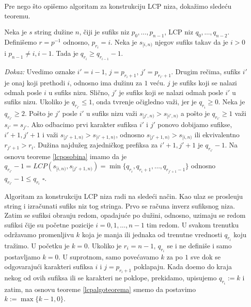 Pre nego \v sto opi\v semo algoritam za konstrukciju LCP niza, doka\v zimo slede\' cu teoremu.

\begin{thm}
\label{lcpalgoteorema}
Neka je $s$ string du\v zine $n$, \v ciji je sufiks niz $p_0, \ldots, p_{n-1}$, LCP niz $q_0, \ldots, q_{n-2}$. Defini\v semo $r = p^{-1}$ odnosno, $p_{r_i} = i$. Neka je $s_{[i, n)}$ njegov sufiks takav da je $i>0$ i $p_{n-1} \not = i, i-1$. Tada je $q_{r_i} \geq q_{r_{i-1}} - 1$.
\end{thm}

\textit{Dokaz:} Uvedimo oznake $i' = i-1$, $j = p_{r_i + 1}$, $j' = p_{r_{i'} + 1}$. Drugim re\v cima, sufiks $i'$ je onaj koji prethodi $i$, odnosno ima du\v zinu za $1$ ve\' cu. $j$ je sufiks koji se nalazi odmah posle $i$ u sufiks nizu. Sli\v cno, $j'$ je sufiks koji se nalazi odmah posle $i'$ u sufiks nizu.  Ukoliko je $q_{r_{i'}} \leq 1$, onda tvr\dj enje o\v cigledno va\v zi, jer je $q_{r_i} \geq 0$. Neka je $q_{r_{i'}} \geq 2$. Po\v sto je $j'$ posle $i'$ u sufiks nizu va\v zi $s_{[j', n)} > s_{[i', n)}$ a po\v sto je $q_{r_{i'}} \geq 1$ va\v zi $s_{i'} = s_{j'}$. Ako odbacimo prvi karakter sufiksa $i'$ i $j'$ ponovo dobijamo sufikse, $i'+1, j'+1$ i va\v zi $s_{[j'+1, n)} > s_{[i'+1, n)}$, odnosno $s_{[j'+1, n)} > s_{[i, n)}$ ili ekvivalentno $r_{j'+1} > r_i$. Du\v zina najdu\v zeg zajedni\v ckog prefiksa za $i'+1, j'+1$ je $q_{r_{i'}} - 1$. Na osnovu teoreme \ref{lcposobina} imamo da je $q_{r_{i'}} - 1 = LCP(s_{[i, n)}, s_{[j'+1, n)}) = \min\{ q_{r_i}, q_{r_i+1}, \ldots, q_{r_{j'+1}-1} \}$ odnosno $q_{r_{i'}} - 1 \leq q_{r_i}$ \hfill $\square$.

Algoritam za konstrukciju LCP niza radi na slede\' ci na\v cin. Kao ulaz se prosle\dj uju string i izra\v cunati sufiks niz tog stringa. Prvo se ra\v cuna inverz sufiksnog niza. Zatim se sufiksi obra\dj uju redom, opadaju\' ce po du\v zini, odnosno, uzimaju se redom sufiksi \v cije su po\v cetne pozicije $i = 0, 1, \ldots, n-1$ tim redom. U svakom trenutku odr\v zavamo promenljivu $k$ koja je manja ili jednaka od trenutne vrednosti $q_{r_i}$ koju tra\v zimo. U po\v cetku je $k=0$. Ukoliko je $r_i = n-1$, $q_{r_i}$ se i ne defini\v se i samo postavljamo $k=0$. U suprotnom, samo pove\' cavamo $k$ za po $1$ sve dok se odgovaraju\' ci karakteri sufiksa $i$ i $j = p_{r_i + 1}$ poklapaju. Kada do\dj emo do kraja nekog od ovih sufiksa ili se karakteri ne poklope, prekidamo, upisujemo $q_{r_i} := k$ i zatim, na osnovu teoreme \ref{lcpalgoteorema} smemo da postavimo $k := \max\{k-1, 0\}$.

